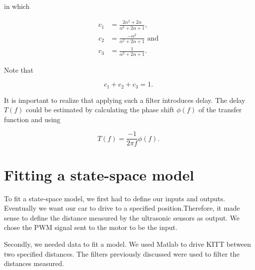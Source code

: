 \documentclass[11pt,titlepage]{report}
\begin{document}
in which

\begin{align}
	c_1 &= \frac{2 \alpha^2 + 2 \alpha}{\alpha^2 + 2 \alpha + 1}, \\
	c_2 &= \frac{-\alpha^2}{\alpha^2 + 2 \alpha + 1}\text{ and} \\
	c_3 &= \frac{1}{\alpha^2+2 \alpha + 1}.
\end{align}

Note that

\begin{equation}
	c_1 + c_2 + c_3 = 1.
\end{equation}

It is important to realize that applying such a filter introduces delay. The delay $T(f)$ could be estimated by calculating the phase shift $\phi(f)$ of the transfer function and using

\begin{equation}
	T(f) = \frac{-1}{2 \pi f} \phi(f).
\end{equation}

\section{Fitting a state-space model}
To fit a state-space model, we first had to define our inputs and outputs. Eventually we want our car to drive to a specified position.Therefore, it made sense to define the distance measured by the ultrasonic sensors as output. We chose the PWM signal sent to the motor to be the input.

Secondly, we needed data to fit a model. We used Matlab to drive KITT between two specified distances. The filters previously discussed were used to filter the distances measured.
\end{document}
